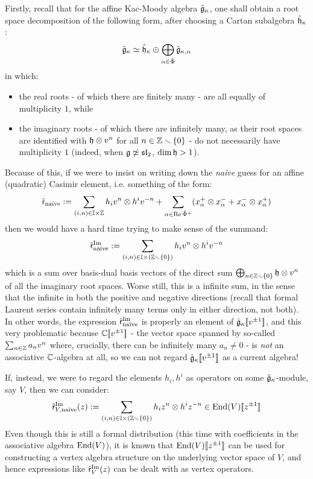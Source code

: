         Firstly, recall that for the affine Kac-Moody algebra $\hat{\mathfrak{g}}_{\kappa}$, one shall obtain a root space decomposition of the following form, after choosing a Cartan subalgebra $\hat{\mathfrak{h}}_{\kappa}$:
            $$\hat{\mathfrak{g}}_{\kappa} \simeq \hat{\mathfrak{h}}_{\kappa} \oplus \bigoplus_{\alpha \in \hat{\Phi}} \hat{\mathfrak{g}}_{\kappa, \alpha}$$
        in which:
        \begin{itemize}
            \item the real roots - of which there are finitely many - are all equally of multiplicity $1$, while
            \item the imaginary roots - of which there are infinitely many, as their root spaces are identified with $\h \tensor v^n$ for all $n \in \mathbb{Z} \smallsetminus \{0\}$ - do not necessarily have multiplicity $1$ (indeed, when $\mathfrak{g} \not \simeq \mathfrak{sl}_2$, $\dim \mathfrak{h} > 1$).
        \end{itemize}
        Because of this, if we were to insist on writing down the \textit{na\"ive} guess for an affine (quadratic) Casimir element, i.e. something of the form:
            $$\hat{\sfr}_{\text{na\"ive}} := \sum_{(i, n) \in \simpleroots \x \Z} h_i v^n \tensor h^i v^{-n} + \sum_{\alpha \in \Re \hat{\Phi}^+} (x_{\alpha}^+ \tensor x_{\alpha}^- + x_{\alpha}^- \tensor x_{\alpha}^+)$$
        then we would have a hard time trying to make sense of the summand:
            $$\hat{\sfr}_{\text{na\"ive}}^{\Im} := \sum_{(i, n) \in \simpleroots \x (\Z \setminus \{0\})} h_i v^n \tensor h^i v^{-n}$$
        which is a sum over basis-dual basis vectors of the direct sum $\bigoplus_{n \in \Z \setminus \{0\}} \h \tensor v^n$ of all the imaginary root spaces. Worse still, this is a  infinite sum, in the sense that the infinite in both the positive and negative directions (recall that formal Laurent series contain infinitely many terms only in either direction, not both). In other words, the expression $\hat{\mathsf{r}}_{\text{na\"ive}}^{\operatorname{Im}}$ is properly an element of $\hat{\mathfrak{g}}_{\kappa}[\![v^{\pm 1}]\!]$, and this very problematic because $\mathbb{C}[\![v^{\pm 1}]\!]$ - the vector space spanned by so-called  $\sum_{n \in \mathbb{Z}} a_n v^n$ where, crucially, there can be infinitely many $a_n \not = 0$ - is \textit{not} an associative $\mathbb{C}$-algebra at all, so we can not regard $\hat{\mathfrak{g}}_{\kappa}[\![v^{\pm 1}]\!]$ as a current algebra!

        If, instead, we were to regard the elements $h_i, h^i$ as operators on some $\hat{\mathfrak{g}}_{\kappa}$-module, say $V$, then we can consider:
            $$\hat{\sfr}_{V, \text{na\"ive}}^{\Im}(z) := \sum_{(i, n) \in \simpleroots \x (\Z \setminus \{0\})} h_i z^n \tensor h^i z^{-n} \in \End(V)[\![z^{\pm 1}]\!]$$
        Even though this is still a formal distribution (this time with coefficients in the associative algebra $\mathrm{End}(V)$), it is known that $\mathrm{End}(V)[\![z^{\pm 1}]\!]$ can be used for constructing a vertex algebra structure on the underlying vector space of $V$, and hence expressions like $\hat{\mathsf{r}}_V^{\operatorname{Im}}(z)$ can be dealt with as vertex operators.

